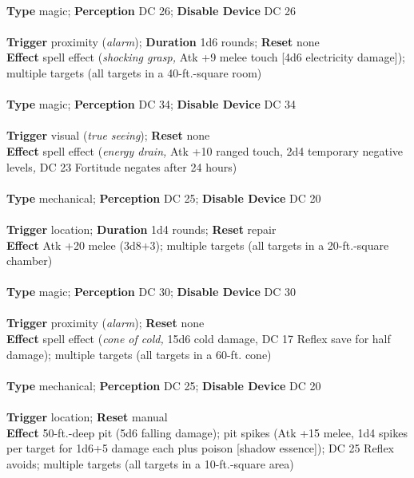 \\
\textbf{Type }magic; \textbf{Perception} DC 26; \textbf{Disable Device} DC 26\\
\\
\textbf{Trigger} proximity (\textit{alarm}); \textbf{Duration }1d6 rounds; \textbf{Reset} none\\
\textbf{Effect }spell effect (\textit{shocking grasp, }Atk +9 melee touch [4d6 electricity damage]); multiple targets (all targets in a 40-ft.-square room)\\

\\
\textbf{Type }magic; \textbf{Perception} DC 34; \textbf{Disable Device} DC 34\\
\\
\textbf{Trigger} visual (\textit{true seeing}); \textbf{Reset} none\\
\textbf{Effect }spell effect (\textit{energy drain, }Atk +10 ranged touch, 2d4 temporary negative levels\textit{, }DC 23 Fortitude negates after 24 hours)\\

\\
\textbf{Type }mechanical; \textbf{Perception} DC 25; \textbf{Disable Device} DC 20\\
\\
\textbf{Trigger} location; \textbf{Duration }1d4 rounds; \textbf{Reset} repair\\
\textbf{Effect }Atk +20 melee (3d8+3); multiple targets (all targets in a 20-ft.-square chamber)\\

\\
\textbf{Type }magic; \textbf{Perception} DC 30; \textbf{Disable Device} DC 30\\
\\
\textbf{Trigger} proximity (\textit{alarm}); \textbf{Reset} none\\
\textbf{Effect }spell effect (\textit{cone of cold, }15d6 cold damage, DC 17 Reflex save for half damage); multiple targets (all targets in a 60-ft. cone)\\

\\
\textbf{Type }mechanical; \textbf{Perception} DC 25; \textbf{Disable Device} DC 20\\
\\
\textbf{Trigger} location; \textbf{Reset} manual\\
\textbf{Effect }50-ft.-deep pit (5d6 falling damage); pit spikes (Atk +15 melee, 1d4 spikes per target for 1d6+5 damage each plus poison [shadow essence]); DC 25 Reflex avoids; multiple targets (all targets in a 10-ft.-square area)\\

